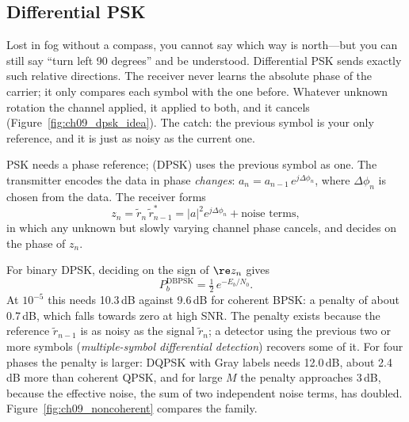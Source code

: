 \subsection{Differential PSK}

\begin{analogy}
Lost in fog without a compass, you cannot say which way is north---but you can still say ``turn
left 90 degrees'' and be understood. Differential PSK sends exactly such relative directions.
The receiver never learns the absolute phase of the carrier; it only compares each symbol with
the one before. Whatever unknown rotation the channel applied, it applied to both, and it
cancels (Figure~\ref{fig:ch09_dpsk_idea}). The catch: the previous symbol is your only reference,
and it is just as noisy as the current one.
\end{analogy}

PSK needs a phase reference;  (DPSK) uses the previous symbol as one. The
transmitter encodes the data in phase \emph{changes}: $a_n=a_{n-1}\,e^{j\Delta\phi_n}$, where
$\Delta\phi_n$ is chosen from the data. The receiver forms
\begin{equation}
z_n=\tilde r_n\,\tilde r_{n-1}^{*}=|a|^2e^{j\Delta\phi_n}+\text{noise terms},
\label{eq:ch09:dpsk}
\end{equation}
in which any unknown but slowly varying channel phase cancels, and decides on the phase of $z_n$.


For binary DPSK, deciding on the sign of $\re z_n$ gives
\begin{equation}
P_b^{\text{DBPSK}}=\tfrac12\,e^{-E_b/N_0}.
\end{equation}
At $10^{-5}$ this needs 10.3\,dB against 9.6\,dB for coherent BPSK: a penalty of about 0.7\,dB,
which falls towards zero at high SNR. The penalty exists because the reference $\tilde r_{n-1}$ is
as noisy as the signal $\tilde r_n$; a detector using the previous two or more symbols
(\emph{multiple-symbol differential detection}) recovers some of it. For four phases the penalty
is larger: DQPSK with Gray labels needs 12.0\,dB, about 2.4\,dB more than coherent QPSK, and for
large $M$ the penalty approaches 3\,dB, because the effective noise, the sum of two independent
noise terms, has doubled. Figure~\ref{fig:ch09_noncoherent} compares the family.

